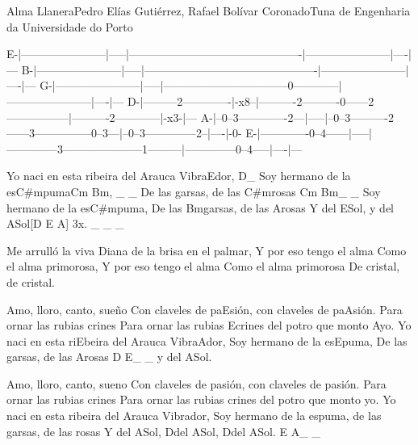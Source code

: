 \begin{musica}{Alma Llanera}{Pedro Elías Gutiérrez, Rafael Bolívar Coronado}{Tuna de Engenharia da Universidade do Porto}
\begin{tablatura}[xleftmargin=0.0cm]
E-|-----------------------|-----|----------------------------------------------|-----------------------|----|---
B-|-----------------------|-----|----------------------------------------------|-----------------------|----|---
G-|-----------------------|-----|---------------------------------0------------|-----------------------|----|---
D-|---------2-------------|-x8--|----------2----------0------2-----------------|----------2------------|-x3-|---
A-|--0--3-------------2---|-----|--0--3----------2------3---------------0--3---|--0--3--------------2--|----|-0-
E-|-------------0--4------|-----|--------------3---------------------1---------|--------------0--4-----|----|---
\end{tablatura}

Yo naci en esta ribeira del Arauca Vibra\ac{E}{dor}, \ac{D}{}_
Soy hermano de la es\ac{C#m}{pu}ma\ac{Cm Bm}{}, _ _
De las garsas, de las \ac{C#m}{ro}sas \ac{Cm Bm}{}_ _
Soy hermano de la es\ac{C#m}{pu}ma,
De las \ac{Bm}{gar}sas, de las \ac{A}{ro}sas
Y del \ac{E}{Sol}, y del \ac{A}{Sol}\ac{[D E A] 3x}{}. _ _ _

Me arrulló la viva Diana de la brisa en el palmar,
Y por eso tengo el alma
Como el alma primorosa,
Y por eso tengo el alma
Como el alma primorosa
De cristal, de cristal.

Amo, lloro, canto, sueño
Con claveles de pa\ac{E}{sión}, con claveles de pa\ac{A}{sión}.
Para ornar las rubias crines
Para ornar las rubias \ac{E}{cri}nes del potro que monto \ac{A}{yo}.
Yo naci en esta ri\ac{E}{bei}ra del Arauca Vibra\ac{A}{dor},
Soy hermano de la es\ac{E}{pu}ma,
De las garsas, de las \ac{A}{ro}sas \ac{D E}{}_ _ y del \ac{A}{Sol}.


Amo, lloro, canto, sueno
Con claveles de pasión, con claveles de pasión. Para ornar las rubias crines
Para ornar las rubias crines del potro que monto yo.
Yo naci en esta ribeira del Arauca Vibrador,
Soy hermano de la espuma, de las garsas, de las rosas
Y del \ac{A}{Sol}, \ac{D}{del} \ac{A}{Sol}, \ac{D}{del} \ac{A}{Sol}. \ac{E A}{}_ _

\end{musica}
